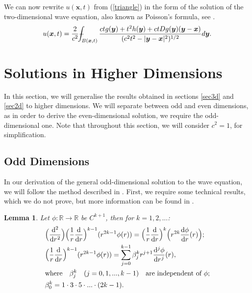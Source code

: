 \documentclass[a4paper, 12pt]{article}
\def\Xint#1{\mathchoice
{\XXint\displaystyle\textstyle{#1}}%
{\XXint\textstyle\scriptstyle{#1}}%
{\XXint\scriptstyle\scriptscriptstyle{#1}}%
{\XXint\scriptscriptstyle\scriptscriptstyle{#1}}%
\!\int}
\def\XXint#1#2#3{{\setbox0=\hbox{$#1{#2#3}{\int}$ }
\vcenter{\hbox{$#2#3$ }}\kern-.6\wd0}}
\def\dashint{\Xint-}
\numberwithin{equation}{section}
\begin{document}
We can now rewrite $u(\boldsymbol{x},t)$ from (\ref{triangle}) in the form of
the solution of the two-dimensional wave equation, also known as Poisson's
formula, see \cite[Ch. 2.4.1.c]{Ev}.
\begin{equation} \label{poiss}
    u(\boldsymbol{x},t)=\frac{2}{c^2}\dashint_{B(\boldsymbol{x},t)} \frac{ctg(\boldsymbol{y})+t^2h(\boldsymbol{y})+ctDg(\boldsymbol{y})(\boldsymbol{y}-\boldsymbol{x})}{(c^2t^2-|\boldsymbol{y}-\boldsymbol{x}|^2)^{1/2}}d\boldsymbol{y}.
\end{equation}

\section{Solutions in Higher Dimensions}

In this section, we will generalise the results obtained in sections \ref{sec3d}
and \ref{sec2d} to higher dimensions. We will separate between odd and
even dimensions, as in order to derive the even-dimensional solution, we require the
odd-dimensional one. Note that throughout this section, we will consider
$c^2=1$, for simplification.

\subsection{Odd Dimensions}

In our derivation of the general odd-dimensional solution to the wave equation,
we will follow the method described in \cite[Ch. 2.4.1.d]{Ev}. First, we require some
technical results, which we do not prove, but more information can be found in
\cite[Ch. 2.4.1.d, Lemma 2]{Ev}. 


\newtheorem{lemma}{Lemma}
\begin{lemma} \label{lemma}
    Let $\phi:\mathbb{R} \to \mathbb{R}$ be $C^{k+1}$, then for $k=1, 2, ...$:
    \begin{align}
        &\Big(\diff[2]{}{r}\Big)\Big( \frac{1}{r} \diff{}{r}\Big)^{k-1}(r^{2k-1}\phi(r))=\Big( \frac{1}{r} \diff{}{r}\Big)^k \Big(r^{2k} \diff{\phi}{r}(r) \Big); \label{i}\\
        &\Big( \frac{1}{r} \diff{}{r}\Big)^{k-1}(r^{2k-1}\phi(r))=\sum^{k-1}_{j=0} \beta_{j}^{k} r^{j+1} \diff[j]{\phi}{r}(r), \label{ii} \\
        &\textrm{where} \quad \beta_{j}^{k} \quad (j=0,1,...,k-1) \quad \textrm{are independent of $\phi$}; \nonumber \\
        &\beta_{0}^{k}=1 \cdot 3 \cdot 5 \cdot ... \cdot (2k-1). \label{iii}
    \end{align}
\end{lemma}
\end{document}
